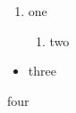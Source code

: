 \documentclass{article}
\begin{document}
\begin{enumerate}\item one \begin{enumerate}\item two\end{enumerate}\end{enumerate}
\begin{itemize}\item three\end{itemize}
\begin{steps}\item four\end{steps}
\end{document}
